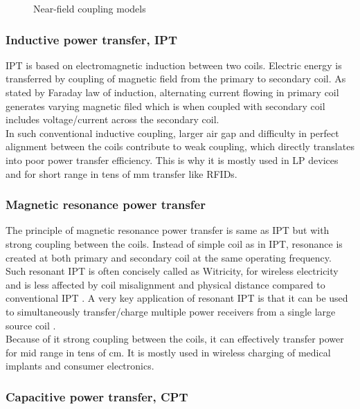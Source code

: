 \documentclass[12pt,a4paper,UKenglish]{report}
\begin{document}
\begin{figure} [htbp]
 	\caption{Near-field coupling models} 
	\label{visio_model_near} 
\end{figure}

\subsubsection{Inductive power transfer, IPT}

IPT is based on electromagnetic induction between two coils. Electric energy is transferred by coupling of 
magnetic field from the primary to secondary coil. As stated by Faraday law of induction, alternating current 
flowing in primary coil generates varying magnetic filed which is when coupled with secondary coil includes 
voltage/current across the secondary coil. \\

In such conventional inductive coupling, larger air gap and difficulty in perfect alignment between the coils 
contribute to weak coupling, which directly translates into poor power transfer efficiency. This is why it is 
mostly used in LP devices and for short range in tens of mm transfer like RFIDs. \\

\subsubsection{Magnetic resonance power transfer}

The principle of magnetic resonance power transfer is same as IPT but with strong coupling between the coils. 
Instead of simple coil as in IPT, resonance is created at both primary and secondary coil at the same operating 
frequency. Such resonant IPT is often concisely called as  Witricity, for wireless electricity and is less 
affected by coil misalignment and physical distance compared to conventional IPT  \cite{wpt_witricity}. A very 
key application of resonant IPT is that it can be used to simultaneously transfer/charge multiple power 
receivers from a single large source coil \cite{wpt_mutliple_device_charging}. \\

Because of it strong coupling between the coils, it can effectively transfer power for mid range in tens of cm. 
It is mostly used in  wireless charging of medical implants and consumer electronics. \\

\subsubsection{Capacitive power transfer, CPT}
\end{document}
